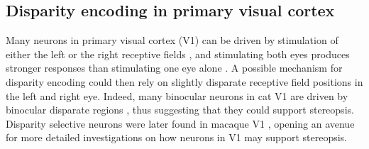 

\subsection{Disparity encoding in primary visual cortex}


Many neurons in primary visual cortex (V1) can be driven by stimulation of either the left or the right receptive fields \cite{HUBEL:1959tz,HUBEL:1962ti, Poggio1972}, and stimulating both eyes produces stronger responses than stimulating one eye alone \cite{HUBEL:1959tz,HUBEL:1962ti}. A possible mechanism for disparity encoding could then rely on slightly disparate receptive field positions in the left and right eye. Indeed, many binocular neurons in cat V1 are driven by binocular disparate regions \cite{Barlow:1967bs,Pettigrew:1968zr,Nikara:1968ys}, thus suggesting that they could support stereopsis. Disparity selective neurons were later found in macaque V1 \cite{Poggio:1977ys,Poggio:1981tg}, opening an avenue for more detailed investigations on how neurons in V1 may support stereopsis.

